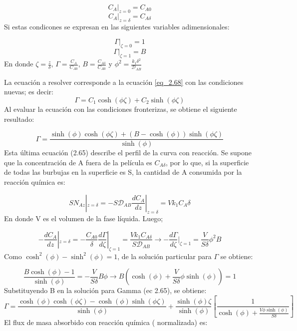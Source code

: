 \begin{equation}
    C_A|_{z=0}=C_{A0} \label{eq_2.67}
\end{equation}
\begin{equation}
    C_A|_{z=\delta}=C_{A\delta}\label{eq_2.68}
\end{equation}
Si estas condicones se expresan en las siguientes variables adimensionales:

\begin{equation*}
    \Gamma|_{\zeta=0}=1
\end{equation*}
\begin{equation*}
    \Gamma|_{\zeta=1}=B
\end{equation*}
En donde $\zeta=\frac{z}{\delta}$, $\Gamma=\frac{C_A}{C_{A0}}$, $B=\frac{C_{A\delta}}{C_{A0}}$ y $\phi^2=\frac{k_1\delta^2}{\mathscr{D}_{AB}}$

La ecuación a resolver corresponde a la ecuación \ref{eq_2.68} con las condiciones nuevas; es decir:
\begin{equation*}
    \Gamma=C_1\cosh({\phi\zeta})+C_2\sinh({\phi\zeta})
\end{equation*}
Al evaluar la ecuación con las condiciones fronterizas, se obtiene el siguiente resultado:

\begin{equation}
    \Gamma=\frac{\sinh(\phi)\cosh(\phi\zeta)+(B-\cosh(\phi))\sinh(\phi\zeta)}{\sinh(\phi)}
\end{equation}
Esta última ecuación (2.65) describe el perfil de la curva con reacción. Se supone que la concentración de A fuera de la película es $C_{A\delta}$, por lo que, si la superficie de todas las burbujas en la superficie es S, la cantidad de A consumida por la reacción química es:

\begin{equation}
    SN_{Az}|_{z=\delta}=-S\mathscr{D}_{AB}\frac{dC_A}{dz}|_{z=\delta}=Vk_1C_A\delta
\end{equation}
En donde V es el volumen de la fase líquida.
Luego;

\begin{equation*}
    -\frac{dC_A}{dz}|_{z=\delta}=-\frac{C_{A0}}{\delta}\frac{d\Gamma}{d\zeta}|_{\zeta=1}=\frac{Vk_1C_{A\delta}}{S\mathscr{D}_{AB}}\longrightarrow-\frac{d\Gamma}{d\zeta}|_{\zeta=1}=\frac{V}{S\delta}\phi^2B
\end{equation*}
Como $\cosh^2(\phi)-\sinh^2(\phi)=1$, de la solución particular para $\Gamma$ se obtiene:

\begin{equation*}
    \frac{B\cosh(\phi)-1}{\sinh(\phi)}=-\frac{V}{S\delta}B\phi\longrightarrow B(\cosh(\phi)+\frac{V}{S\delta}\phi\sinh(\phi))=1
\end{equation*}
Substituyendo B en la solución para Gamma (ec 2.65), se obtiene:
\begin{equation}
    \Gamma=\frac{\cosh(\phi)\cosh(\phi\zeta)-\cosh(\phi)\sinh(\phi\zeta)}{\sinh(\phi)}+\frac{\sinh(\phi)\zeta}{\sinh(\phi)}[\frac{1}{\cosh(\phi)+\frac{V\phi\sinh(\phi)}{S\delta}}]
\end{equation}
El flux de masa absorbido con reacción química ( normalizada) es:

